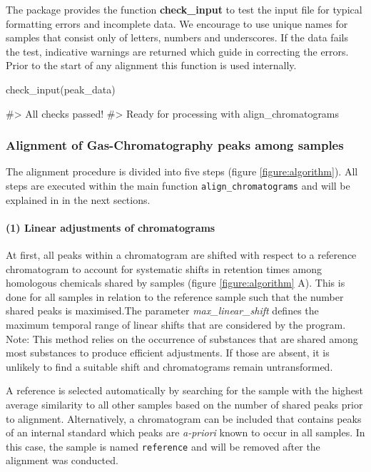 The package provides the function \textbf{check\_input} to test the
input file for typical formatting errors and incomplete data. We
encourage to use unique names for samples that consist only of letters,
numbers and underscores. If the data fails the test, indicative warnings
are returned which guide in correcting the errors. Prior to the start of
any alignment this function is used internally.

\begin{Schunk}
\begin{Sinput}
check_input(peak_data)
\end{Sinput}
\begin{Soutput}
#> All checks passed!
#> Ready for processing with align_chromatograms
\end{Soutput}
\end{Schunk}

\subsubsection{Alignment of Gas-Chromatography peaks among
samples}\label{alignment-of-gas-chromatography-peaks-among-samples}

The alignment procedure is divided into five steps (figure
\ref{figure:algorithm}). All steps are executed within the main function
\texttt{align\_chromatograms} and will be explained in in the next
sections.

\paragraph{(1) Linear adjustments of
chromatograms}\label{linear-adjustments-of-chromatograms}

At first, all peaks within a chromatogram are shifted with respect to a
reference chromatogram to account for systematic shifts in retention
times among homologous chemicals shared by samples (figure
\ref{figure:algorithm} A). This is done for all samples in relation to
the reference sample such that the number shared peaks is maximised.The
parameter \emph{max\_linear\_shift} defines the maximum temporal range
of linear shifts that are considered by the program. \newline
Note: This method relies on the occurrence of substances that are shared
among most substances to produce efficient adjustments. If those are
absent, it is unlikely to find a suitable shift and chromatograms remain
untransformed. \par
A reference is selected automatically by searching for the sample with
the highest average similarity to all other samples based on the number
of shared peaks prior to alignment. Alternatively, a chromatogram can be
included that contains peaks of an internal standard which peaks are
\textit{a-priori} known to occur in all samples. In this case, the
sample is named \texttt{reference} and will be removed after the
alignment was conducted.

